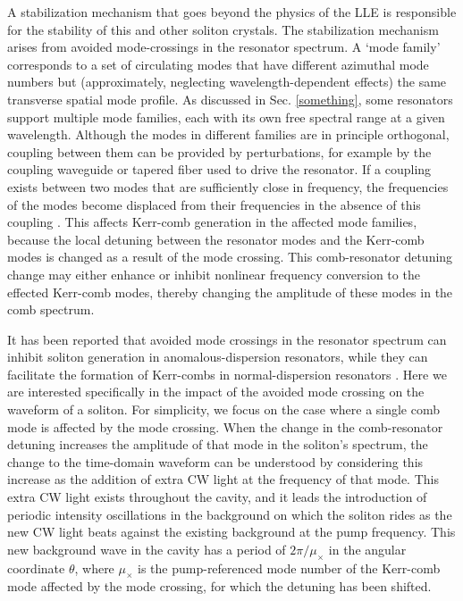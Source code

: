A stabilization mechanism that goes beyond the physics of the LLE is responsible for the stability of this and other soliton crystals. The stabilization mechanism arises from avoided mode-crossings in the resonator spectrum. A `mode family' corresponds to a set of circulating modes that have different azimuthal mode numbers but (approximately, neglecting wavelength-dependent effects) the same transverse spatial mode profile. As discussed in Sec. \ref{something}, some resonators support multiple mode families, each with its own free spectral range at a given wavelength. Although the modes in different families are in principle orthogonal, coupling between them can be provided by perturbations, for example by the coupling waveguide or tapered fiber used to drive the resonator. If a coupling exists between two modes that are sufficiently close in frequency, the frequencies of the modes become displaced from their frequencies in the absence of this coupling \cite{Haus1991}. This affects Kerr-comb generation in the affected mode families, because the local detuning between the resonator modes and the Kerr-comb modes is changed as a result of the mode crossing. This comb-resonator detuning change may either enhance or inhibit nonlinear frequency conversion to the effected Kerr-comb modes, thereby changing the amplitude of these modes in the comb spectrum. 

It has been reported that avoided mode crossings in the resonator spectrum can inhibit soliton generation in anomalous-dispersion resonators\cite{4,6}, while they can facilitate the formation of Kerr-combs in normal-dispersion resonators\cite{37} . Here we are interested specifically in the impact of the avoided mode crossing on the waveform of a soliton. For simplicity, we focus on the case where a single comb mode is affected by the mode crossing. When the change in the comb-resonator detuning increases the amplitude of that mode in the soliton's spectrum, the change to the time-domain waveform can be understood by considering this increase as the addition of extra CW light at the frequency of that mode. This extra CW light exists throughout the cavity, and it leads the introduction of periodic intensity oscillations in the background on which the soliton rides as the new CW light beats against the existing background at the pump frequency. This new background wave in the cavity has a period of $2\pi/\mu_\times$ in the angular coordinate $\theta$, where $\mu_\times$ is the pump-referenced mode number of the Kerr-comb mode affected by the mode crossing, for which the detuning has been shifted. 

